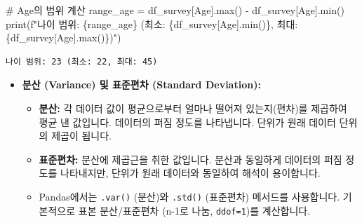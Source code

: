 \documentclass[
  letterpaper,
]{book}
\newenvironment{Shaded}{\begin{snugshade}}{\end{snugshade}}
\newcommand{\BuiltInTok}[1]{\textcolor[rgb]{0.00,0.23,0.31}{#1}}
\newcommand{\CommentTok}[1]{\textcolor[rgb]{0.37,0.37,0.37}{#1}}
\newcommand{\NormalTok}[1]{\textcolor[rgb]{0.00,0.23,0.31}{#1}}
\newcommand{\OperatorTok}[1]{\textcolor[rgb]{0.37,0.37,0.37}{#1}}
\newcommand{\SpecialCharTok}[1]{\textcolor[rgb]{0.37,0.37,0.37}{#1}}
\newcommand{\SpecialStringTok}[1]{\textcolor[rgb]{0.13,0.47,0.30}{#1}}
\newcommand{\StringTok}[1]{\textcolor[rgb]{0.13,0.47,0.30}{#1}}
\providecommand{\tightlist}{%
  \setlength{\itemsep}{0pt}\setlength{\parskip}{0pt}}
\begin{document}
\begin{Shaded}
\begin{Highlighting}[]
    \CommentTok{\# Age의 범위 계산}
\NormalTok{    range\_age }\OperatorTok{=}\NormalTok{ df\_survey[}\StringTok{\textquotesingle{}Age\textquotesingle{}}\NormalTok{].}\BuiltInTok{max}\NormalTok{() }\OperatorTok{{-}}\NormalTok{ df\_survey[}\StringTok{\textquotesingle{}Age\textquotesingle{}}\NormalTok{].}\BuiltInTok{min}\NormalTok{()}
    \BuiltInTok{print}\NormalTok{(}\SpecialStringTok{f"나이 범위: }\SpecialCharTok{\{}\NormalTok{range\_age}\SpecialCharTok{\}}\SpecialStringTok{ (최소: }\SpecialCharTok{\{}\NormalTok{df\_survey[}\StringTok{\textquotesingle{}Age\textquotesingle{}}\NormalTok{]}\SpecialCharTok{.}\BuiltInTok{min}\NormalTok{()}\SpecialCharTok{\}}\SpecialStringTok{, 최대: }\SpecialCharTok{\{}\NormalTok{df\_survey[}\StringTok{\textquotesingle{}Age\textquotesingle{}}\NormalTok{]}\SpecialCharTok{.}\BuiltInTok{max}\NormalTok{()}\SpecialCharTok{\}}\SpecialStringTok{)"}\NormalTok{)}
\end{Highlighting}
\end{Shaded}

\begin{verbatim}
나이 범위: 23 (최소: 22, 최대: 45)
\end{verbatim}

\begin{itemize}
\tightlist
\item
  \textbf{분산 (Variance) 및 표준편차 (Standard Deviation):}

  \begin{itemize}
  \tightlist
  \item
    \textbf{분산:} 각 데이터 값이 평균으로부터 얼마나 떨어져
    있는지(편차)를 제곱하여 평균 낸 값입니다. 데이터의 퍼짐 정도를
    나타냅니다. 단위가 원래 데이터 단위의 제곱이 됩니다.
  \item
    \textbf{표준편차:} 분산에 제곱근을 취한 값입니다. 분산과 동일하게
    데이터의 퍼짐 정도를 나타내지만, 단위가 원래 데이터와 동일하여
    해석이 용이합니다.
  \item
    Pandas에서는 \texttt{.var()} (분산)와 \texttt{.std()} (표준편차)
    메서드를 사용합니다. 기본적으로 표본 분산/표준편차 (n-1로 나눔,
    \texttt{ddof=1})를 계산합니다.
  \end{itemize}
\end{itemize}
\end{document}

